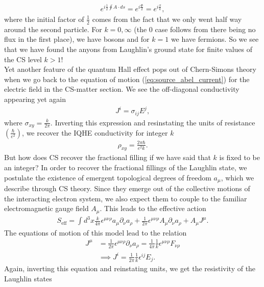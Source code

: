 \begin{align}
    e^{i \frac{1}{2} \oint A \cdot ds}=e^{i \frac{\Phi}{2}}= e^{i \frac{\pi}{k}},
\end{align}
 where the initial factor of $\frac{1}{2}$ comes from the fact that we only went half way around the second particle. For $k=0,\infty$ (the 0 case follows from there being no flux in the first place), we have bosons and for $k=1$ we have fermions. So we see that we have found the anyons from Laughlin's ground state for finite values of the CS level $k>1$!\\
\indent Yet another feature of the quantum Hall effect pops out of Chern-Simons theory when we go back to the equation of motion (\ref{eq:source_abel_current}) for the electric field in the CS-matter section. We see the off-diagonal conductivity appearing yet again
\begin{align}
    J^{i} = \sigma_{ij}E^j,
\end{align}
 where $\sigma_{xy}=\frac{k}{2\pi}$. Inverting this expression and resinstating the units of resistance $\left(\frac{\hbar}{e^2}\right)$, we recover the IQHE conductivity for integer $k$
\begin{align}
    \rho_{xy} =\frac{2\pi \hbar}{e^2 k}.
\end{align}
 But how does CS recover the fractional filling if we have said that $k$ is fixed to be an integer? In order to recover the fractional fillings of the Laughlin state, we postulate the existence of emergent topological degrees of freedom $a_{\mu}$, which we describe through CS theory. Since they emerge out of the collective motions of the interacting electron system, we also expect them to couple to the familiar electromagnetic gauge field $A_{\mu}$. This leads to the effective action
\begin{align}
    S_{\text{eff}} = \int d^3x \frac{k}{4\pi} \epsilon^{\mu \nu \rho} a_{\mu} \partial_{\nu} a_{\rho} + \frac{1}{2 \pi} \epsilon^{\mu \nu \rho} A_{\mu} \partial_{\nu}a_{\rho}+ A_{\mu} J^{\mu}.
\end{align}
 The equations of motion of this model lead to the relation
\begin{align}
    J^{\mu} &= \frac{1}{2\pi} \epsilon^{\mu \nu \rho} \partial_\nu a_{\rho} = \frac{1}{4\pi} \frac{1}{k} \epsilon^{\mu \nu \rho} F_{\nu \rho} \\
    &\implies J^{i} = \frac{1}{2 \pi} \frac{1}{k} \epsilon^{i j} E_{j}.
\end{align}
 Again, inverting this equation and reinstating units, we get the resistivity of the Laughlin states
